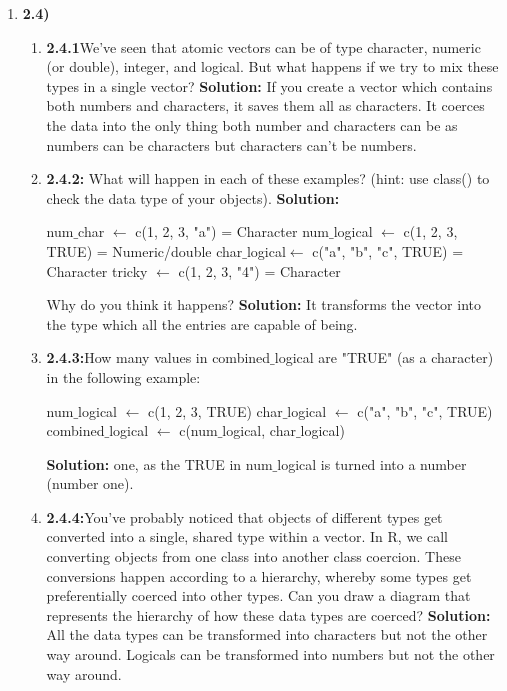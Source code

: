 \documentclass{article}
\begin{document}
\begin{enumerate}
    \item \textbf{2.4)} 
    \begin{enumerate}
        \item \textbf{2.4.1}We’ve seen that atomic vectors can be of type character, numeric (or double), integer, and logical. But what happens if we try to mix these types in a single vector? \textbf{Solution:} If you create a vector which contains both numbers and characters, it saves them all as characters. It coerces the data into the only thing both number and characters can be as numbers can be characters but characters can't be numbers. 
       \item \textbf{2.4.2:} What will happen in each of these examples? (hint: use class() to check the data type of your objects). \textbf{Solution:}
         \begin{center}
            num$\_$char $\leftarrow$ c(1, 2, 3, "a") = Character \newline
            num$\_$logical $\leftarrow$ c(1, 2, 3, TRUE) = Numeric/double\newline
            char$\_$logical$\leftarrow$ c("a", "b", "c", TRUE) = Character \newline 
            tricky $\leftarrow$ c(1, 2, 3, "4") = Character 
        \end{center}
      Why do you think it happens? \textbf{Solution:} It transforms the vector into the type which all the entries are capable of being. \newline
      \item \textbf{2.4.3:}How many values in combined$\_$logical are "TRUE" (as a character) in the following example:
        \begin{center}
          num$\_$logical $\leftarrow$ c(1, 2, 3, TRUE) \newline 
          char$\_$logical $\leftarrow$ c("a", "b", "c", TRUE) \newline
          combined$\_$logical $\leftarrow$ c(num$\_$logical, char$\_$logical)
        \end{center}
      \textbf{Solution:} one, as the TRUE in num$\_$logical is turned into a number (number one).
      \item \textbf{2.4.4:}You’ve probably noticed that objects of different types get converted into a single, shared type within a vector. In R, we call converting objects from one class into another class coercion. These conversions happen according to a hierarchy, whereby some types get preferentially coerced into other types. Can you draw a diagram that represents the hierarchy of how these data types are coerced? \textbf{Solution:} All the data types can be transformed into characters but not the other way around. Logicals can be transformed into numbers but not the other way around. 

\end{enumerate}
\end{enumerate}
\end{document}
